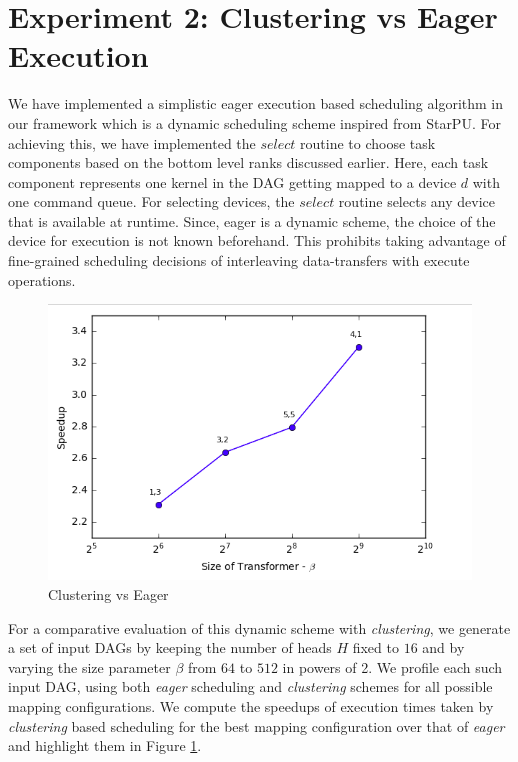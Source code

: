 	\section{Experiment 2: Clustering vs Eager Execution} We have implemented a simplistic eager execution based scheduling algorithm in our framework which is a dynamic scheduling scheme inspired from StarPU. For achieving this, we have implemented the $select$ routine to choose task components based on the bottom level ranks discussed earlier. Here, each task component represents one kernel in the DAG getting mapped to a device $d$ with one command queue.  For selecting devices, the $select$ routine selects any device that is available at runtime. Since, eager is a dynamic scheme, the choice of the device for execution is not known beforehand. This prohibits taking advantage of fine-grained scheduling decisions of interleaving data-transfers with execute operations.
	\begin{figure}[ht]
		\centering
		\includegraphics[scale=0.45]{Pictures/Expt-2.png}
		\caption{\small Clustering vs Eager \label{fig:Expt2}}
	\end{figure}
	\par For a comparative evaluation of this dynamic scheme with {\em clustering}, we generate a set of input DAGs by keeping the number of heads $H$ fixed to $16$ and by varying the size parameter $\beta$ from $64$ to $512$ in powers of 2. We profile each such input DAG, using both {\em eager} scheduling and {\em clustering} schemes for all possible mapping configurations. We compute the speedups of execution times taken by {\em clustering} based scheduling for the best mapping configuration  over that of {\em eager} and highlight them in Figure \ref{fig:Expt2}. 
